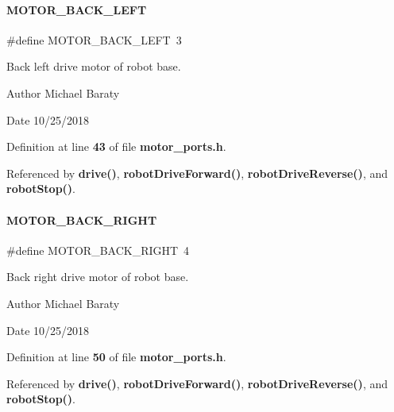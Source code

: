 \paragraph{M\+O\+T\+O\+R\+\_\+\+B\+A\+C\+K\+\_\+\+L\+E\+FT}
{\footnotesize\ttfamily \#define M\+O\+T\+O\+R\+\_\+\+B\+A\+C\+K\+\_\+\+L\+E\+FT~3}



Back left drive motor of robot base. 

\begin{DoxyAuthor}{Author}
Michael Baraty 
\end{DoxyAuthor}
\begin{DoxyDate}{Date}
10/25/2018 
\end{DoxyDate}


Definition at line \textbf{ 43} of file \textbf{ motor\+\_\+ports.\+h}.



Referenced by \textbf{ drive()}, \textbf{ robot\+Drive\+Forward()}, \textbf{ robot\+Drive\+Reverse()}, and \textbf{ robot\+Stop()}.

\mbox{\label{motor__ports_8h_ad85c5f3d6a2d00789c8c67b960c46c2b}} 
\paragraph{M\+O\+T\+O\+R\+\_\+\+B\+A\+C\+K\+\_\+\+R\+I\+G\+HT}
{\footnotesize\ttfamily \#define M\+O\+T\+O\+R\+\_\+\+B\+A\+C\+K\+\_\+\+R\+I\+G\+HT~4}



Back right drive motor of robot base. 

\begin{DoxyAuthor}{Author}
Michael Baraty 
\end{DoxyAuthor}
\begin{DoxyDate}{Date}
10/25/2018 
\end{DoxyDate}


Definition at line \textbf{ 50} of file \textbf{ motor\+\_\+ports.\+h}.



Referenced by \textbf{ drive()}, \textbf{ robot\+Drive\+Forward()}, \textbf{ robot\+Drive\+Reverse()}, and \textbf{ robot\+Stop()}.

\mbox{\label{motor__ports_8h_a0ab0a7d34dc7a35a82eeac0c6746ac63}} 

